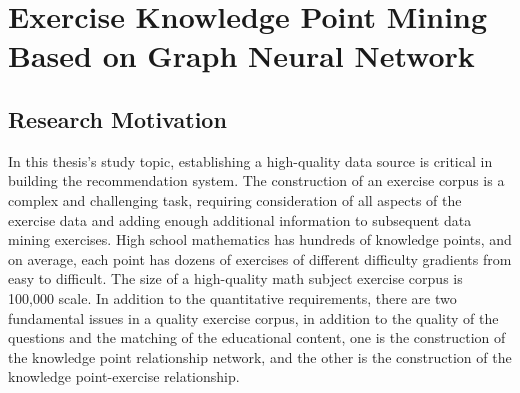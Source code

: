 
\chapter{Exercise Knowledge Point Mining Based on Graph Neural Network}

\ifpdf
    \graphicspath{{Chapter2/Figs/Raster/}{Chapter2/Figs/PDF/}{Chapter2/Figs/}}
\else
    \graphicspath{{Chapter2/Figs/Vector/}{Chapter2/Figs/PDF/}{Chapter2/Figs/}}
\fi


\section{Research Motivation}

In this thesis's study topic, establishing a high-quality data source is critical in building the recommendation system. The construction of an exercise corpus is a complex and challenging task, requiring consideration of all aspects of the exercise data and adding enough additional information to subsequent data mining exercises. High school mathematics has hundreds of knowledge points, and on average, each point has dozens of exercises of different difficulty gradients from easy to difficult. The size of a high-quality math subject exercise corpus is 100,000 scale. In addition to the quantitative requirements, there are two fundamental issues in a quality exercise corpus, in addition to the quality of the questions and the matching of the educational content, one is the construction of the knowledge point relationship network, and the other is the construction of the knowledge point-exercise relationship.

